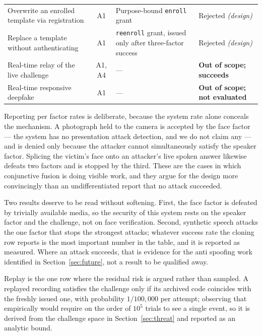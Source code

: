 \documentclass[runningheads]{llncs}
\providecommand{\AttackChallengeSpace}{100{,}000}
\begin{document}
{\begin{table}[!t]
\begin{tabular}{@{}p{4.1cm}cp{3.6cm}p{3.5cm}@{}}
Overwrite an enrolled template via registration & A1 & Purpose-bound \texttt{enroll} grant & Rejected \emph{(design)} \\
Replace a template without authenticating & A1 & \texttt{reenroll} grant, issued only after three-factor success & Rejected \emph{(design)} \\
\midrule
Real-time relay of the live challenge & A1, A4 & --- & \textbf{Out of scope; succeeds} \\
Real-time responsive deepfake & A1 & --- & \textbf{Out of scope; not evaluated} \\
\bottomrule
\end{tabular}
\end{table}

Reporting per factor rates is deliberate, because the system rate alone conceals the mechanism. A photograph held to the camera is accepted by the face factor --- the system has no presentation attack detection, and we do not claim any --- and is denied only because the attacker cannot simultaneously satisfy the speaker factor. Splicing the victim's face onto an attacker's live spoken answer likewise defeats two factors and is stopped by the third. These are the cases in which conjunctive fusion is doing visible work, and they argue for the design more convincingly than an undifferentiated report that no attack succeeded.

Two results deserve to be read without softening. First, the face factor is defeated by trivially available media, so the security of this system rests on the speaker factor and the challenge, not on face verification. Second, synthetic speech attacks the one factor that stops the strongest attacks; whatever success rate the cloning row reports is the most important number in the table, and it is reported as measured. Where an attack succeeds, that is evidence for the anti spoofing work identified in Section~\ref{sec:future}, not a result to be qualified away.

Replay is the one row where the residual risk is argued rather than sampled. A replayed recording satisfies the challenge only if its archived code coincides with the freshly issued one, with probability $1/\AttackChallengeSpace$ per attempt; observing that empirically would require on the order of $10^{5}$ trials to see a single event, so it is derived from the challenge space in Section~\ref{sec:threat} and reported as an analytic bound.

}
\end{document}
